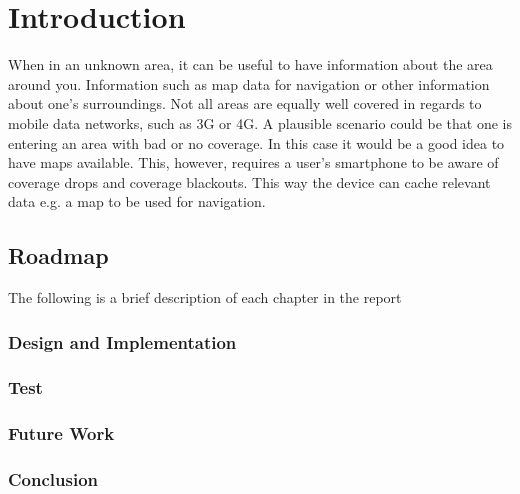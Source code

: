 \chapter{Introduction}
\label{chap:intro}

When in an unknown area, it can be useful to have information about the area around you. Information such as map data for navigation or other information about one's surroundings. Not all areas are equally well covered in regards to mobile data networks, such as 3G or 4G. A plausible scenario could be that one is entering an area with bad or no coverage. In this case it would be a good idea to have maps available. This, however, requires a user's smartphone to be aware of coverage drops and coverage blackouts. This way the device can cache relevant data e.g. a map to be used for navigation.



\section{Roadmap}
The following is a brief description of each chapter in the report

\subsection{Design and Implementation}
\subsection{Test}
\subsection{Future Work}
\subsection{Conclusion}